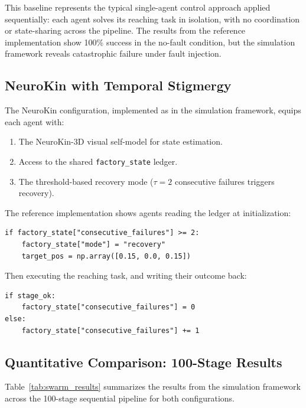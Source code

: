 \documentclass[12pt,a4paper,oneside]{report}
\begin{document}
This baseline represents the typical single-agent control approach applied sequentially: each agent solves its reaching task in isolation, with no coordination or state-sharing across the pipeline. The results from the reference implementation show 100\% success in the no-fault condition, but the simulation framework reveals catastrophic failure under fault injection.

\subsection{NeuroKin with Temporal Stigmergy}
\label{subsec:neurokin_with_temporal_stigmergy}

The NeuroKin configuration, implemented as  in the simulation framework, equips each agent with:

\begin{enumerate}
    \item The NeuroKin-3D visual self-model for state estimation.
    \item Access to the shared \texttt{factory\_state} ledger.
    \item The threshold-based recovery mode ($\tau = 2$ consecutive failures triggers recovery).
\end{enumerate}

The reference implementation shows agents reading the ledger at initialization:

{\small
\begin{verbatim}
if factory_state["consecutive_failures"] >= 2:
    factory_state["mode"] = "recovery"
    target_pos = np.array([0.15, 0.0, 0.15])
\end{verbatim}
}

Then executing the reaching task, and writing their outcome back:

{\small
\begin{verbatim}
if stage_ok:
    factory_state["consecutive_failures"] = 0
else:
    factory_state["consecutive_failures"] += 1
\end{verbatim}
}

\subsection{Quantitative Comparison: 100-Stage Results}
\label{subsec:quantitative_comparison_100_stage_results}

Table~\ref{tab:swarm_results} summarizes the results from the simulation framework across the 100-stage sequential pipeline for both configurations.
\end{document}
